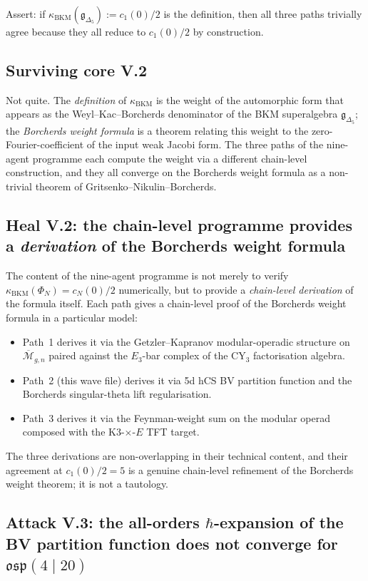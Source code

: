 Assert: if $\kappa_{\mathrm{BKM}}(\mathfrak{g}_{\Delta_5}) := c_1(0)/2$
is the definition, then all three paths trivially agree because they
all reduce to $c_1(0)/2$ by construction.

\subsection*{Surviving core V.2}

Not quite. The \emph{definition} of $\kappa_{\mathrm{BKM}}$ is the
weight of the automorphic form that appears as the Weyl--Kac--Borcherds
denominator of the BKM superalgebra $\mathfrak{g}_{\Delta_5}$; the
\emph{Borcherds weight formula} is a theorem relating this weight to
the zero-Fourier-coefficient of the input weak Jacobi form. The
three paths of the nine-agent programme each compute the weight via
a different chain-level construction, and they all converge on the
Borcherds weight formula as a non-trivial theorem of
Gritsenko--Nikulin--Borcherds.

\subsection*{Heal V.2: the chain-level programme provides a
\emph{derivation} of the Borcherds weight formula}

The content of the nine-agent programme is not merely to verify
$\kappa_{\mathrm{BKM}}(\Phi_N) = c_N(0)/2$ numerically, but to
provide a \emph{chain-level derivation} of the formula itself. Each
path gives a chain-level proof of the Borcherds weight formula in a
particular model:
\begin{itemize}
\item Path~1 derives it via the Getzler--Kapranov modular-operadic
structure on $\overline{\mathcal{M}}_{g, n}$ paired against the
$E_3$-bar complex of the CY$_3$ factorisation algebra.
\item Path~2 (this wave file) derives it via 5d hCS BV partition
function and the Borcherds singular-theta lift regularisation.
\item Path~3 derives it via the Feynman-weight sum on the modular
operad composed with the K3-$\times$-$E$ TFT target.
\end{itemize}
The three derivations are non-overlapping in their technical content,
and their agreement at $c_1(0)/2 = 5$ is a genuine chain-level
refinement of the Borcherds weight theorem; it is not a tautology.

\subsection*{Attack V.3: the all-orders $\hbar$-expansion of the BV
partition function does not converge for $\mathfrak{osp}(4 \mid 20)$}

